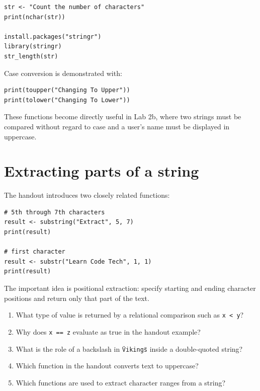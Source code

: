 \begin{lstlisting}[style=dsr]
str <- "Count the number of characters"
print(nchar(str))

install.packages("stringr")
library(stringr)
str_length(str)
\end{lstlisting}

Case conversion is demonstrated with:

\begin{lstlisting}[style=dsr]
print(toupper("Changing To Upper"))
print(tolower("Changing To Lower"))
\end{lstlisting}

These functions become directly useful in Lab 2b, where two strings must be compared without regard to case and a user's name must be displayed in uppercase.

\section{Extracting parts of a string}

The handout introduces two closely related functions:

\begin{lstlisting}[style=dsr]
# 5th through 7th characters
result <- substring("Extract", 5, 7)
print(result)

# first character
result <- substr("Learn Code Tech", 1, 1)
print(result)
\end{lstlisting}

The important idea is positional extraction: specify starting and ending character positions and return only that part of the text.

\begin{quickcheck}
\begin{enumerate}
  \item What type of value is returned by a relational comparison such as \texttt{x < y}?
  \item Why does \texttt{x == z} evaluate as true in the handout example?
  \item What is the role of a backslash in \texttt{\"Vikings\"} inside a double-quoted string?
  \item Which function in the handout converts text to uppercase?
  \item Which functions are used to extract character ranges from a string?
\end{enumerate}
\end{quickcheck}

